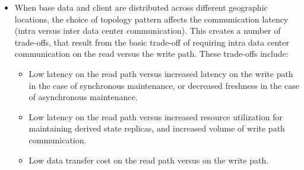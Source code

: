 \begin{itemize}
  \item When base data and client are distributed across different geographic locations,
  the choice of topology pattern affects the communication latency (intra versus inter data center communication).
  This creates a number of trade-offs, that result from the basic trade-off of requiring intra data center communication
  on the read versus the write path.
  These trade-offs include:
  \begin{itemize}
    \item Low latency on the read path versus increased latency on the write path in the case of synchronous maintenance,
    or decreased freshness in the case of asynchronous maintenance.
    \item Low latency on the read path versus increased resource utilization for maintaining derived state replicas,
    and increased volume of write path communication.
    \item Low data transfer cost on the read path versus on the write path.
  \end{itemize}

\end{itemize}